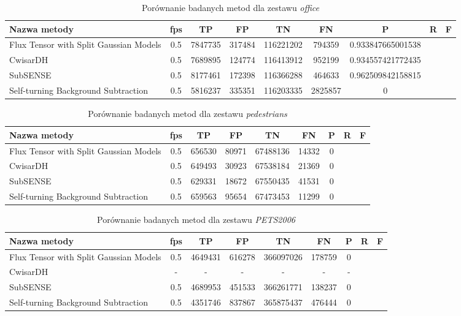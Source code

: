 \begin{table}[h]
\caption{Porównanie badanych metod dla zestawu \textit{office}}
\label{tab:resultsOffice}
\centering
\begin{tabular}{|l*{6}{|c}|}
  \hline 
  \textbf{Nazwa metody} & \textbf{fps} & \textbf{TP} & \textbf{FP} & \textbf{TN} & \textbf{FN} & \textbf{P} & \textbf{R} & \textbf{F}\\
  \hline
  Flux Tensor with Split Gaussian Models & 0.5 & 7847735 & 317484 & 116221202 & 794359 & 0.933847665001538 \\
  \hline
  CwisarDH & 0.5 & 7689895 & 124774 & 116413912 & 952199 & 0.934557421772435 \\
  \hline
  SubSENSE & 0.5 & 8177461 & 172398 & 116366288 & 464633 & 0.962509842158815 \\
  \hline
  Self-turning Background Subtraction & 0.5 & 5816237 & 335351 & 116203335 & 2825857 & 0 \\
  \hline
\end{tabular}
\end{table}

\begin{table}[h]
\caption{Porównanie badanych metod dla zestawu \textit{pedestrians}}
\label{tab:resultsPedestrians}
\centering
\begin{tabular}{|l*{6}{|c}|}
  \hline 
  \textbf{Nazwa metody} & \textbf{fps} & \textbf{TP} & \textbf{FP} & \textbf{TN} & \textbf{FN} & \textbf{P} & \textbf{R} & \textbf{F}\\
  \hline
  Flux Tensor with Split Gaussian Models & 0.5 & 656530 & 80971 & 67488136 & 14332 & 0 \\
  \hline
  CwisarDH & 0.5 & 649493 & 30923 & 67538184 & 21369 & 0 \\
  \hline
  SubSENSE & 0.5 & 629331 & 18672 & 67550435 & 41531 & 0 \\
  \hline
  Self-turning Background Subtraction & 0.5 & 659563 & 95654 & 67473453 & 11299 & 0 \\
  \hline
\end{tabular}
\end{table}

\begin{table}[h]
\caption{Porównanie badanych metod dla zestawu \textit{PETS2006}}
\label{tab:resultsPETS2006}
\centering
\begin{tabular}{|l*{6}{|c}|}
  \hline 
  \textbf{Nazwa metody} & \textbf{fps} & \textbf{TP} & \textbf{FP} & \textbf{TN} & \textbf{FN} & \textbf{P} & \textbf{R} & \textbf{F}\\
  \hline
  Flux Tensor with Split Gaussian Models & 0.5 & 4649431 & 616278 & 366097026 & 178759 & 0 \\
  \hline
  CwisarDH & - & - & - & - & - & - \\
  \hline
  SubSENSE & 0.5 & 4689953 & 451533 & 366261771 & 138237 & 0 \\
  \hline
  Self-turning Background Subtraction & 0.5 & 4351746 & 837867 & 365875437 & 476444 & 0 \\
  \hline
\end{tabular}
\end{table}


